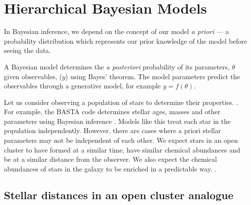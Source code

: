 %
%
%
%
%
\chapter{Hierarchical Bayesian Models}


In Bayesian inference, we depend on the concept of our model \emph{a priori} --- a probability distribution which represents our prior knowledge of the model before seeing the data.

A Bayesian model determines the \emph{a posteriori} probability of its parameters, \(\theta\) given observables, (\(y\)) using Bayes' theorem. The model parameters predict the observables through a generative model, for example \(y = f(\theta)\). 

Let us consider observing a population of stars to determine their properties. . For example, the BASTA code determines stellar ages, masses and other parameters using Bayesian inference \citep{SilvaAguirre.Davies.ea2015,AguirreBorsen-Koch.Rorsted.ea2022}. Models like this treat each star in the population independently. However, there are cases where a priori stellar parameters may not be independent of each other. We expect stars in an open cluster to have formed at a similar time, have similar chemical abundances and be at a similar distance from the observer. We also expect the chemical abundances of stars in the galaxy to be enriched in a predictable way. .

\section[Stellar distances]{Stellar distances in an open cluster analogue}\label{sec:hbm-dist}

